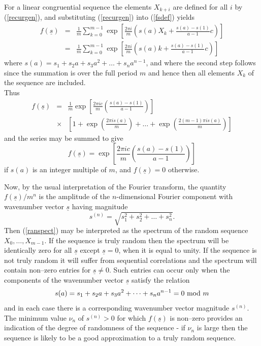 \documentclass[dvips]{article}
\begin{document}
For a linear congruential sequence the elements $X_{k+i}$ are defined
for all $i$ by (\ref{recurgen}), and substituting (\ref{recurgen}) into
(\ref{fsdef}) yields
\begin{eqnarray}
f(\underline{s})
& = & \frac{1}{m} \sum_{k=0}^{m-1} \exp{\left[\frac{2\pi
i}{m}\left(s(a)X_{k} + \frac{s(a)-s(1)}{a-1}c\right)\right]}
\nonumber\\
& = & \frac{1}{m} \sum_{k=0}^{m-1} \exp{\left[\frac{2\pi
i}{m}\left(s(a)k + \frac{s(a)-s(1)}{a-1}c\right)\right]}
\end{eqnarray}
where $s(a) = s_{1}+s_{2}a+s_{3}a^{2}+\dots +s_{n}a^{n-1}$, and
where the second step follows since the summation is over the full period
$m$ and hence then all elements $X_{k}$ of the sequence are included.\\
Thus
\begin{eqnarray}
f(\underline{s})
& = & \frac{1}{m}\exp{\left[\frac{2\pi ic}{m}
\left(\frac{s(a)-s(1)}{a-1}\right)\right]}
\nonumber\\ & \times &
\left[1 + \exp{\left(\frac{2\pi i s(a)}{m}\right)}
        +\dots
        + \exp{\left(\frac{2(m-1)\pi i s(a)}{m}\right)}\right]
\nonumber
\end{eqnarray}
and the series may be summed to give
\begin{equation}
f(\underline{s}) = \exp{\left[\frac{2\pi ic}{m}
\left(\frac{s(a)-s(1)}{a-1}\right)\right]}
\label{ranspect}
\end{equation}
if $s(a)$ is an integer multiple of $m$, and $f(\underline{s}) = 0$ otherwise.

Now, by the usual interpretation of the Fourier transform, the
quantity $f(\underline{s})/m^{n}$ is the amplitude of the
$n$-dimensional Fourier component with wavenumber vector $\underline{s}$
having magnitude 
\begin{equation}
s^{(n)} = \sqrt{s_{1}^{2}+s_{2}^{2}+\dots +s_{n}^{2}}.
\label{smag}
\end{equation}
Then (\ref{ranspect}) may be interpreted as the spectrum of the random sequence
$X_{0},\ldots ,X_{m-1}$.  If the sequence is truly random then the
spectrum will be identically zero for all $\underline{s}$ except
$\underline{s}=0$, when it is equal to unity.  If the sequence is not
truly random it will suffer from sequential correlations and the
spectrum will contain non--zero entries for $\underline{s}\neq 0$.
Such entries can occur only when the components of the wavenumber
vector $\underline{s}$ satisfy the relation
\begin{equation}
s(a) = s_{1}+s_{2}a+s_{3}a^{2}+\dots +s_{n}a^{n-1} = 0 \ {\rm mod} \ m
\label{scond}
\end{equation}
and in each case there is a corresponding wavenumber vector magnitude
$s^{(n)}$.
The minimum value $\nu_{n}$ of $s^{(n)}>0$ for which $f(\underline{s})$ is
non--zero provides an indication of the degree of randomness of the sequence
- if $\nu_{n}$ is large then the sequence is likely to be a good approximation
to a truly random sequence.
\end{document}
